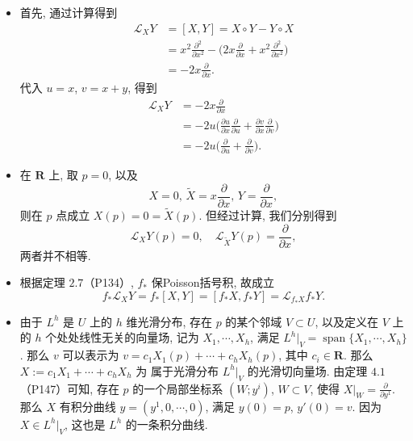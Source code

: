 \begin {itemize}
    \item[25.]
    首先, 通过计算得到
    \begin{align*}
        \mathscr{L}_X Y & = [X, Y] = X \circ Y - Y \circ X\\
        & = x^2 \frac{\partial^2}{\partial x^2}
        - \Big(2x \frac{\partial}{\partial x}
        + x^2 \frac{\partial^2}{\partial x^2}\Big)\\
        & = -2x \frac{\partial}{\partial x}.
    \end{align*}
    代入 $u = x$, $v = x + y$, 得到
    \begin{align*}
        \mathscr{L}_X Y & = -2x \frac{\partial}{\partial x}\\
        & = -2u\Big(\frac{\partial u}{\partial x} \frac{\partial}{\partial u}
        + \frac{\partial v}{\partial x} \frac{\partial}{\partial v}\Big)\\
        & = -2u\Big(\frac{\partial}{\partial u} + \frac{\partial}{\partial v}\Big).
    \end{align*}

    \item[26.]
    在 $\mathbf{R}$ 上, 取 $p = 0$, 以及
    \[
        X = 0,\, \tilde{X} = x \frac{\partial}{\partial x},\, Y = \frac{\partial}{\partial x},
    \]
    则在 $p$ 点成立 $X(p) = 0 = \tilde{X}(p)$. 但经过计算, 我们分别得到
    \[
        \mathscr{L}_X Y (p) = 0,\quad
        \mathscr{L}_{\tilde{X}} Y (p) = \frac{\partial}{\partial x},
    \]
    两者并不相等.

    \item[27.]
    根据定理 $2.7$（P134）, $f_*$ 保Poisson括号积, 故成立
    \[
        f_* \mathscr{L}_X Y = f_* [X, Y] = [f_* X, f_* Y] = \mathscr{L}_{f_* X} f_* Y.
    \]

    \item[28.]
    由于 $L^h$ 是 $U$ 上的 $h$ 维光滑分布, 存在 $p$ 的某个邻域 $V \subset U$, 
    以及定义在 $V$ 上的 $h$ 个处处线性无关的向量场, 记为 $X_1, \cdots, X_h$, 
    满足 $L^h |_V = \operatorname{span}\{X_1, \cdots, X_h\}$.
    那么 $v$ 可以表示为 $v = c_1 X_1(p) + \cdots + c_h X_h(p)$, 
    其中 $c_i \in \mathbf{R}$. 
    那么 $X := c_1 X_1 + \cdots + c_h X_h$ 为 属于光滑分布 $L^h |_V$  的光滑切向量场. 
    由定理 $4.1$ （P147）可知, 存在 $p$ 的一个局部坐标系 $(W;y^i)$, $W \subset V$, 
    使得 $X|_W = \frac{\partial}{\partial y^1}$.
    那么 $X$ 有积分曲线 $y = (y^1, 0, \cdots, 0)$, 满足 $y(0) = p$, $y'(0) = v$. 
    因为 $X \in L^h |_V$, 这也是 $L^h$ 的一条积分曲线.


\end{itemize}
